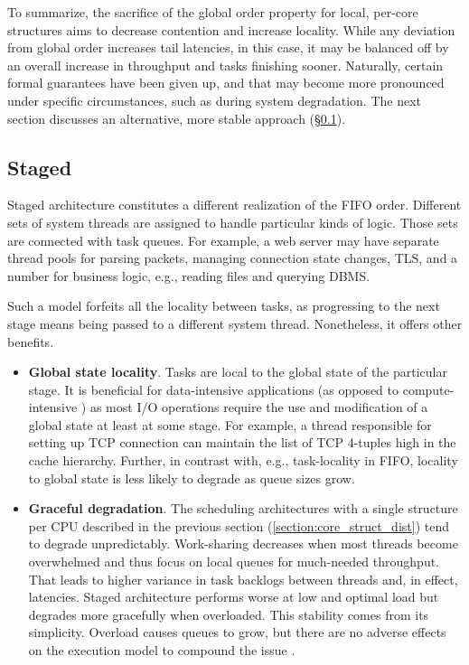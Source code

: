 \documentclass[12pt,a4paper,twoside]{report}
\begin{document}
To summarize, the sacrifice of the global order property for local, per-core structures aims to decrease contention and increase locality. While any deviation from global order increases tail latencies, in this case, it may be balanced off by an overall increase in throughput and tasks finishing sooner. Naturally, certain formal guarantees have been given up, and that may become more pronounced under specific circumstances, such as during system degradation. The next section discusses an alternative, more stable approach (\S\ref{section:design-staged}).
    
\subsection{Staged}
\label{section:design-staged}

Staged architecture \cite{Welsh2001} constitutes a different realization of the FIFO order. Different sets of system threads are assigned to handle particular kinds of logic. Those sets are connected with task queues. For example, a web server may have separate thread pools for parsing packets, managing connection state changes, TLS, and a number for business logic, e.g., reading files and querying DBMS.

Such a model forfeits all the locality between tasks, as progressing to the next stage means being passed to a different system thread. Nonetheless, it offers other benefits. 
\begin{itemize}
    \item \textbf{Global state locality}. Tasks are local to the global state of the particular stage. It is beneficial for data-intensive applications (as opposed to compute-intensive \cite{Kleppmann2017-en}) as most I/O operations require the use and modification of a global state at least at some stage. For example, a thread responsible for setting up TCP connection can maintain the list of TCP 4-tuples high in the cache hierarchy. Further, in contrast with, e.g., task-locality in FIFO, locality to global state is less likely to degrade as queue sizes grow.
    \item \textbf{Graceful degradation}. The scheduling architectures with a single structure per CPU described in the previous section (\ref{section:core_struct_dist}) tend to degrade unpredictably. Work-sharing decreases when most threads become overwhelmed and thus focus on local queues for much-needed throughput. That leads to higher variance in task backlogs between threads and, in effect, latencies. Staged architecture performs worse at low and optimal load but degrades more gracefully when overloaded. This stability comes from its simplicity. Overload causes queues to grow, but there are no adverse effects on the execution model to compound the issue \cite{Welsh2001}.
\end{itemize}
\end{document}
